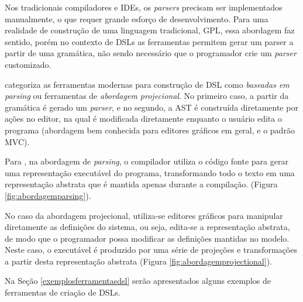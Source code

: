 Nos tradicionais compiladores e \gls{IDE}s, os \textit{parsers} precisam ser implementados manualmente, o que requer grande esforço de desenvolvimento. Para uma realidade de construção de uma linguagem tradicional, \gls{GPL}, essa abordagem faz sentido, porém no contexto de \gls{DSL}s as ferramentas permitem gerar um parser a partir de uma gramática, não sendo necessário que o programador crie um \textit{parser} customizado.

 categoriza as ferramentas modernas para construção de \gls{DSL} como \textit{baseadas em parsing} ou ferramentas de \textit{abordagem projecional}. No primeiro caso, a partir da gramática é gerado um \textit{parser}, e no segundo, a \gls{AST} é construída diretamente por ações no editor, na qual é modificada diretamente enquanto o usuário edita o programa (abordagem bem conhecida para editores gráficos em geral, e o padrão \gls{MVC}). 

Para , na abordagem de \textit{parsing}, o compilador utiliza o código fonte para gerar uma representação executável do programa, transformando todo o texto em uma representação abstrata que é mantida apenas durante a compilação. (Figura \ref{fig:abordagemparsing}). 



\newpage
No caso da abordagem projecional, utiliza-se editores gráficos para manipular diretamente as definições do sistema, ou seja, edita-se a representação abstrata, de modo que o programador possa modificar as definições mantidas no modelo. Neste caso, o executável é produzido por uma série de projeções e transformações a partir desta representação abstrata (Figura \ref{fig:abordagemprojectional}).




Na Seção \ref{exemplosferramentasdsl} serão apresentados alguns exemplos de ferramentas de criação de \gls{DSL}s.


